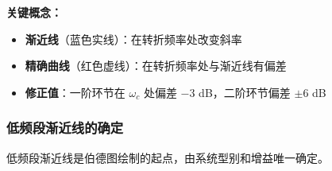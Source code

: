 \vspace{0.3cm}
\textbf{关键概念：}
\begin{itemize}
    \item \textbf{渐近线}（蓝色实线）：在转折频率处改变斜率
    \item \textbf{精确曲线}（红色虚线）：在转折频率处与渐近线有偏差
    \item \textbf{修正值}：一阶环节在 $\omega_c$ 处偏差 $-3$ dB，二阶环节偏差 $\pm 6$ dB
\end{itemize}

\subsubsection{低频段渐近线的确定}

低频段渐近线是伯德图绘制的起点，由系统型别和增益唯一确定。


